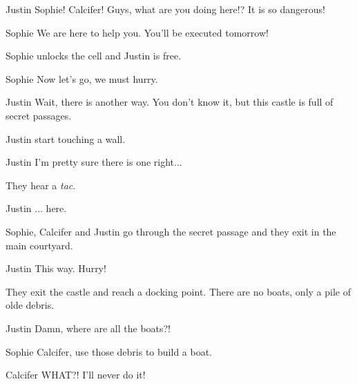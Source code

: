 \begin{screenplay}

\begin{dialogue}{Justin}
Sophie! Calcifer! Guys, what are you doing here!? It is so dangerous!
\end{dialogue}

\begin{dialogue}{Sophie}
We are here to help you. You'll be executed tomorrow!
\end{dialogue}

Sophie unlocks the cell and Justin is free.

\begin{dialogue}{Sophie}
Now let's go, we must hurry.
\end{dialogue}

\begin{dialogue}{Justin}
Wait, there is another way. You don't know it, but this castle is full of secret passages.
\end{dialogue}

Justin start touching a wall.

\begin{dialogue}[continuing]{Justin}
I'm pretty sure there is one right...
\end{dialogue}

They hear a \textit{tac}.

\begin{dialogue}[continuing]{Justin}
... here.
\end{dialogue}

Sophie, Calcifer and Justin go through the secret passage and they exit in the main courtyard.

\begin{dialogue}{Justin}
This way. Hurry! 
\end{dialogue}

They exit the castle and reach a docking point. There are no boats, only a pile of olde debris.

\begin{dialogue}[worried]{Justin}
Damn, where are all the boats?!
\end{dialogue}

\begin{dialogue}{Sophie}
Calcifer, use those debris to build a boat.
\end{dialogue}

\begin{dialogue}[scared]{Calcifer}
WHAT?! I'll never do it!
\end{dialogue}


\end{screenplay}

